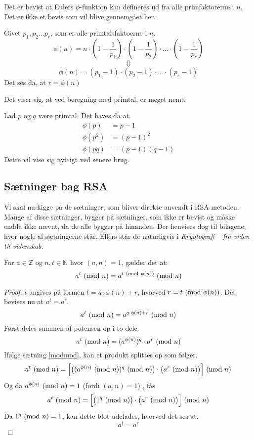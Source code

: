 Det er bevist at Eulers \(\phi\)-funktion kan defineres ud fra alle primfaktorerne i \(n\).
Det er ikke et bevis som vil blive gennemgået her.

\begin{sent}
    Givet \(p_1, p_2 \hdots p_r\), som er alle primtalsfaktoerne i \(n\).
    \[\phi(n) = n \cdot \left(1-\frac{1}{p_1}\right) \cdot \left(1-\frac{1}{p_2}\right) \cdot \hdots \cdot \left(1-\frac{1}{p_r}\right)\]
    \[\Updownarrow\]
    \[\phi(n) = (p_1 - 1) \cdot (p_2 - 1) \cdot \hdots \cdot (p_r - 1)\]
    Det ses da, at \(r = \phi(n)\)
\end{sent}

Det viser sig, at ved beregning med primtal, er meget nemt.

\begin{eks}
    Lad \(p\) og \(q\) være primtal. Det haves da at.\\
    \begin{align}
        \phi(p)   &= p - 1\\
        \phi(p^2) &= (p - 1)^2\\
        \phi(p q) &= (p - 1)(q - 1)
    \end{align}
    Dette vil vise sig nyttigt ved senere brug.
\end{eks}



\subsection{Sætninger bag RSA}
Vi skal nu kigge på de sætninger, som bliver direkte anvendt i RSA metoden.
Mange af disse sætninger, bygger på sætninger, som ikke er bevist og måske endda ikke nævnt, da de alle bygger på hinanden.
Der henvises dog til bilagene, hvor nogle af sætningerne står.
Ellers står de naturligvis i \textit{Kryptografi -- fra viden til videnskab}. \cite{krypto}\\

\begin{sent}
    \label{eulerssent}
    For \(a \in \mathbb{Z}\) og \(n, t \in \mathbb{N}\) hvor \((a, n) = 1\), gælder det at:
    \[a^t \ (\mathrm{mod}\ n) = a^{t \ (\mathrm{mod}\ \phi(n))} \ (\mathrm{mod}\ n)\]
\end{sent}

\begin{proof}
    \(t\) angives på formen \(t = q \cdot \phi(n) + r\), hvorved \(r = t \ (\mathrm{mod}\ \phi(n))\).
    Det bevises nu at \(a^t = a^r\).
    \[a^t \ (\mathrm{mod}\ n) = a^{q \cdot \phi(n) + r} \ (\mathrm{mod}\ n)\]
    Først deles summen af potensen op i to dele.
    \[a^t \ (\mathrm{mod}\ n) = (a^{\phi(n)})^q \cdot a^r \ (\mathrm{mod}\ n)\]
    Ifølge sætning \ref{modmod}, kan et produkt splittes op som følger.
    \[a^t \ (\mathrm{mod}\ n) = \Big[ \big( (a^{\phi(n)} \ (\mathrm{mod}\ n))^q \ (\mathrm{mod}\ n) \big) \cdot \big( a^r \ (\mathrm{mod}\ n) \big) \Big] \ (\mathrm{mod}\ n)\] %
    Og da \(a^{\phi(n)} \ (\mathrm{mod}\ n) = 1\) (fordi \((a, n) = 1\)) \cite[90]{krypto}, fås
    \[a^t \ (\mathrm{mod}\ n) = \Big[ \big( 1^q \ (\mathrm{mod}\ n) \big) \cdot \big( a^r \ (\mathrm{mod}\ n) \big) \Big] \ (\mathrm{mod}\ n)\]
    Da \(1^q \ (\mathrm{mod}\ n) = 1\), kan dette blot udelades, hvorved det ses at.
    \[a^t = a^r\]
\end{proof}

